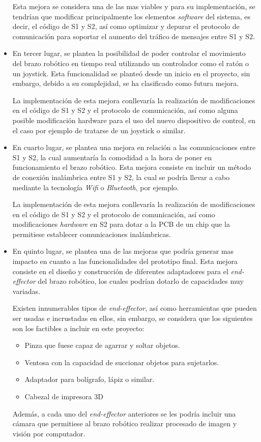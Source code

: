 \begin{itemize}
    Esta mejora se considera una de las mas viables y para su implementación, se tendrían que modificar principalmente los elementos \textit{software} del sistema, es decir, el código de \ac{S1} y \ac{S2}, así como optimizar y depurar el protocolo de comunicación para soportar el aumento del tráfico de mensajes entre \ac{S1} y \ac{S2}.
    
    \item En tercer lugar, se plantea la posibilidad de poder controlar el movimiento del brazo robótico en tiempo real utilizando un controlador como el ratón o un joystick. Esta funcionalidad se planteó desde un inicio en el proyecto, sin embargo, debido a su complejidad, se ha clasificado como futura mejora.
    
    La implementación de esta mejora conllevaría la realización de modificaciones en el código de \ac{S1} y \ac{S2} y el protocolo de comunicación, así como alguna posible modificación hardware para el uso del nuevo dispositivo de control, en el caso por ejemplo de tratarse de un joystick o similar.
    
    \item En cuarto lugar, se plantea una mejora en relación a las comunicaciones entre \ac{S1} y \ac{S2}, la cual aumentaría la comodidad a la hora de poner en funcionamiento el brazo robótico. Esta mejora consiste en incluir un método de conexión inalámbrica entre \ac{S1} y \ac{S2}, la cual se podría llevar a cabo mediante la tecnología \textit{Wifi} o \textit{Bluetooth}, por ejemplo.
    
    La implementación de esta mejora conllevaría la realización de modificaciones en el código de \ac{S1} y \ac{S2} y el protocolo de comunicación, así como modificaciones \textit{hardware} en \ac{S2} para dotar a la PCB de un chip que la permitiese establecer comunicaciones inalámbricas.
    
    \item En quinto lugar, se plantea una de las mejoras que podría generar mas impacto en cuanto a las funcionalidades del prototipo final. Esta mejora consiste en el diseño y construcción de diferentes adaptadores para el \textit{end-effector} del brazo robótico, los cuales podrían dotarlo de capacidades muy variadas.
    
    Existen innumerables tipos de \textit{end-effector}, así como herramientas que pueden ser usadas e incrustadas en ellos, sin embargo, se considera que los siguientes son los factibles a incluir en este proyecto:
    \begin{itemize}
        \item Pinza que fuese capaz de agarrar y soltar objetos.
        \item Ventosa con la capacidad de succionar objetos para sujetarlos.
        \item Adaptador para bolígrafo, lápiz o similar.
        \item Cabezal de impresora 3D
    \end{itemize}
    Además, a cada uno del \textit{end-effector} anteriores se les podría incluir una cámara que permitiese al brazo robótico realizar procesado de imagen y visión por computador.
    

\end{itemize}
